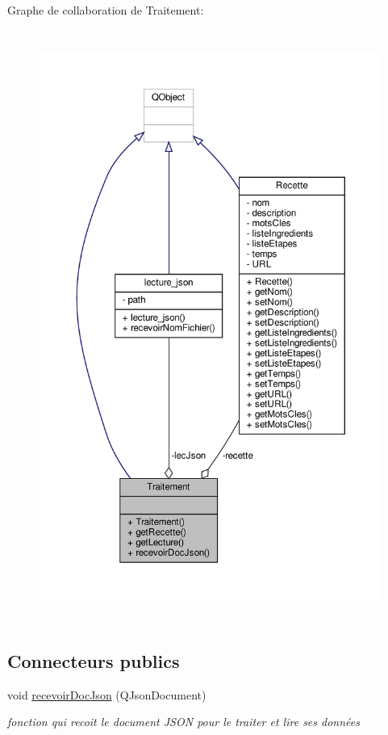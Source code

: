 Graphe de collaboration de Traitement\+:\nopagebreak
\begin{figure}[H]
\begin{center}
\leavevmode
\includegraphics[height=550pt]{classTraitement__coll__graph}
\end{center}
\end{figure}
\subsection*{Connecteurs publics}
\begin{DoxyCompactItemize}
\item 
void \hyperlink{classTraitement_aa66e6be8e21062472a6c1e9a95097dc5}{recevoir\+Doc\+Json} (Q\+Json\+Document)
\begin{DoxyCompactList}\small\item\em fonction qui recoit le document J\+S\+ON pour le traiter et lire ses données \end{DoxyCompactList}\end{DoxyCompactItemize}
